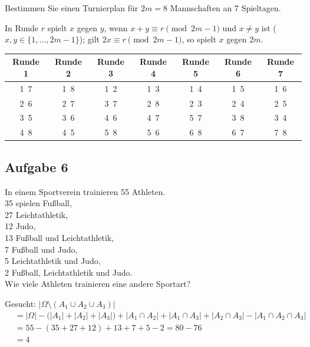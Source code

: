 \begin{aufgabe}[Aufgabe 5]
Bestimmen Sie einen Turnierplan für $2m = 8$ Mannschaften an 7 Spieltagen.
\end{aufgabe}

\begin{loesung}
In Runde $r$ spielt $x$ gegen $y$, wenn $x + y \equiv r \pmod{2m-1}$ und $x \neq y$ ist ($x, y \in \{1, \dots, 2m-1\}$); gilt $2x \equiv r \pmod{2m-1}$, so spielt $x$ gegen $2m$.

\medskip
\begin{tabular}{ccccccc}
\toprule
Runde 1 & Runde 2 & Runde 3 & Runde 4 & Runde 5 & Runde 6 & Runde 7\\
\midrule
1\ 7 & 1\ 8 & 1\ 2 & 1\ 3 & 1\ 4 & 1\ 5 & 1\ 6\\
2\ 6 & 2\ 7 & 3\ 7 & 2\ 8 & 2\ 3 & 2\ 4 & 2\ 5\\
3\ 5 & 3\ 6 & 4\ 6 & 4\ 7 & 5\ 7 & 3\ 8 & 3\ 4\\
4\ 8 & 4\ 5 & 5\ 8 & 5\ 6 & 6\ 8 & 6\ 7 & 7\ 8\\
\bottomrule
\end{tabular}
\end{loesung}

\subsection{Aufgabe 6}

\begin{aufgabe}[Aufgabe 6]
In einem Sportverein trainieren 55 Athleten.\\
35 spielen Fußball,\\
27 Leichtathletik,\\
12 Judo,\\
13 Fußball und Leichtathletik,\\
7 Fußball und Judo,\\
5 Leichtathletik und Judo,\\
2 Fußball, Leichtathletik und Judo.\\
Wie viele Athleten trainieren eine andere Sportart?
\end{aufgabe}

\begin{loesung}
Gesucht: $\left|\Omega \setminus (A_1 \cup A_2 \cup A_3)\right|$
\begin{align*}
&= |\Omega| - \bigl(|A_1| + |A_2| + |A_3|\bigr) + |A_1 \cap A_2| + |A_1 \cap A_3| + |A_2 \cap A_3| - |A_1 \cap A_2 \cap A_3|\\
&= 55 - (35 + 27 + 12) + 13 + 7 + 5 - 2 = 80 - 76\\
&= 4
\end{align*}
\end{loesung}

